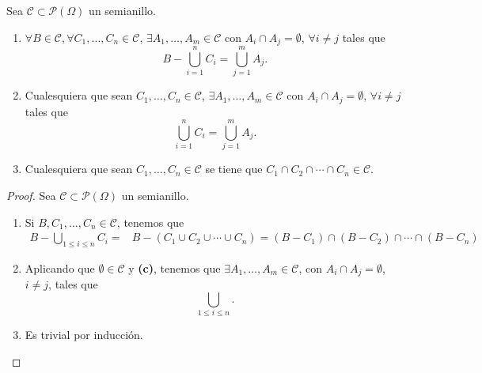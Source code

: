 \begin{prop} Sea $\displaystyle \mathcal{C} \subset \mathcal{P}\left(\Omega \right) $ un semianillo.
\begin{enumerate}
\item $\displaystyle \forall B \in \mathcal{C}, \forall C_{1}, \ldots, C_{n} \in \mathcal{C} $, $\displaystyle \exists A_{1}, \ldots, A_{m} \in \mathcal{C} $ con $\displaystyle A_{i} \cap A_{j} = \emptyset $, $\displaystyle \forall i \neq j $ tales que 
	\[B - \bigcup_{i = 1}^{n}C_{i} = \bigcup_{j = 1}^{m}A_{j} .\]
\item Cualesquiera que sean $\displaystyle C_{1}, \ldots, C_{n} \in \mathcal{C} $, $\displaystyle \exists A_{1}, \ldots, A_{m} \in \mathcal{C} $ con $\displaystyle A_{i} \cap A_{j} = \emptyset $, $\displaystyle \forall i \neq j $ tales que
	\[\bigcup_{i = 1}^{n}C_{i} = \bigcup_{j = 1}^{m}A_{j} .\]
\item Cualesquiera que sean $\displaystyle C_{1}, \ldots, C_{n} \in \mathcal{C} $ se tiene que $\displaystyle C_{1} \cap C_{2} \cap \cdots \cap C_{n} \in \mathcal{C} $.
\end{enumerate}
\end{prop}
\begin{proof}
Sea $\displaystyle \mathcal{C} \subset \mathcal{P}\left(\Omega \right) $ un semianillo.
\begin{enumerate}
\item Si $\displaystyle B, C_{1}, \ldots, C_{n} \in \mathcal{C} $, tenemos que 
\[
\begin{split}
	B - \bigcup_{1 \leq i \leq n}C_{i} = & B - \left(C_{1} \cup C_{2} \cup \cdots \cup C_{n}\right) = \left(B - C_{1}\right) \cap \left(B - C_{2}\right) \cap \cdots \cap \left(B - C_{n}\right) 
\end{split}
\]
\item Aplicando que $\displaystyle \emptyset \in \mathcal{C} $ y \textbf{(c)}, tenemos que $\displaystyle \exists A_{1}, \ldots, A_{m} \in \mathcal{C} $, con $\displaystyle A_{i} \cap A_{j}  = \emptyset $, $\displaystyle i \neq j $, tales que 
	\[\bigcup_{1 \leq i \leq n} .\]
\item Es trivial por inducción.
\end{enumerate}
\end{proof}

